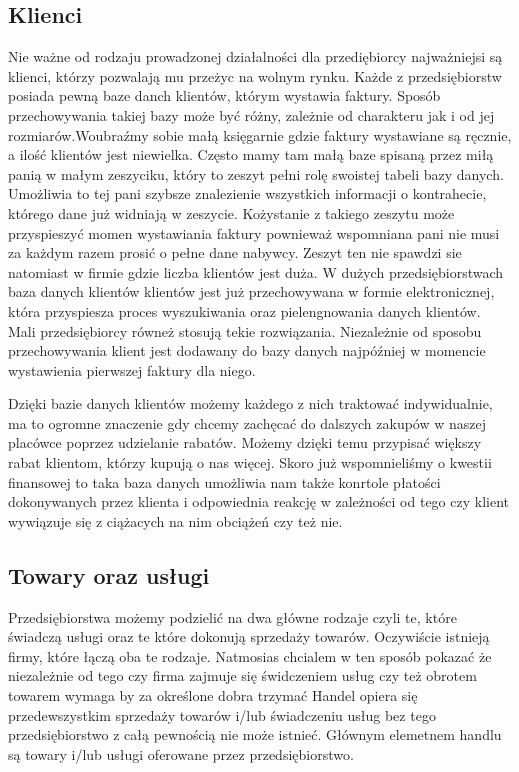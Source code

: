 \documentclass[12pt, a4paper]{article}
\begin{document}
\subsection{Klienci}
\label{klienci}
Nie ważne od rodzaju prowadzonej działalności dla przediębiorcy najważniejsi są
klienci, którzy pozwalają mu przeżyc na wolnym rynku. Każde z przedsiębiorstw
posiada pewną baze danch klientów, którym wystawia faktury. Sposób
przechowywania takiej bazy może być różny, zależnie od charakteru jak i od jej
rozmiarów.Woubraźmy sobie małą księgarnie gdzie faktury wystawiane są ręcznie, a
ilość klientów jest niewielka. Często mamy tam małą baze spisaną przez miłą
panią w małym zeszyciku, który to zeszyt pełni rolę swoistej tabeli bazy danych. Umożliwia to tej pani szybsze znalezienie wszystkich informacji o kontrahecie, którego dane już widniają w zeszycie. Kożystanie z takiego zeszytu może przyspieszyć momen
wystawiania faktury pownieważ wspomniana pani nie musi za każdym razem prosić o
pełne dane nabywcy. Zeszyt ten nie spawdzi sie natomiast w firmie gdzie
liczba klientów jest duża. W dużych przedsiębiorstwach baza danych klientów
klientów jest już przechowywana w formie elektronicznej, która przyspiesza
proces wyszukiwania oraz pielengnowania danych klientów. Mali przedsiębiorcy
równeż stosują tekie rozwiązania. Niezależnie od sposobu przechowywania klient
jest dodawany do bazy danych najpóźniej w momencie wystawienia pierwszej faktury
dla niego. 

Dzięki bazie danych klientów możemy każdego z nich traktować indywidualnie, ma
to ogromne znaczenie gdy chcemy zachęcać do dalszych zakupów w naszej placówce
poprzez udzielanie rabatów. Możemy dzięki temu przypisać większy rabat klientom,
którzy kupują o nas więcej. Skoro już wspomnieliśmy o kwestii finansowej to taka
baza danych umożliwia nam także konrtole płatości dokonywanych przez klienta i
odpowiednia reakcję w zależności od tego czy klient wywiązuje się z ciążacych na
nim obciążeń czy też nie.
\subsection{Towary oraz usługi}
Przedsiębiorstwa możemy podzielić na dwa główne rodzaje czyli te, które świadczą
usługi oraz te które dokonują sprzedaży towarów. Oczywiście istnieją firmy,
które łączą oba te rodzaje. Natmosias chcialem w ten sposób pokazać że
niezależnie od tego czy firma zajmuje się świdczeniem usług czy też obrotem
towarem wymaga by za określone dobra trzymać  Handel opiera się przedewszystkim
sprzedaży towarów i/lub świadczeniu usług bez tego przedsiębiorstwo z całą pewnością nie może istnieć.   Głównym elemetnem handlu są towary i/lub usługi oferowane przez przedsiębiorstwo.
\end{document}
